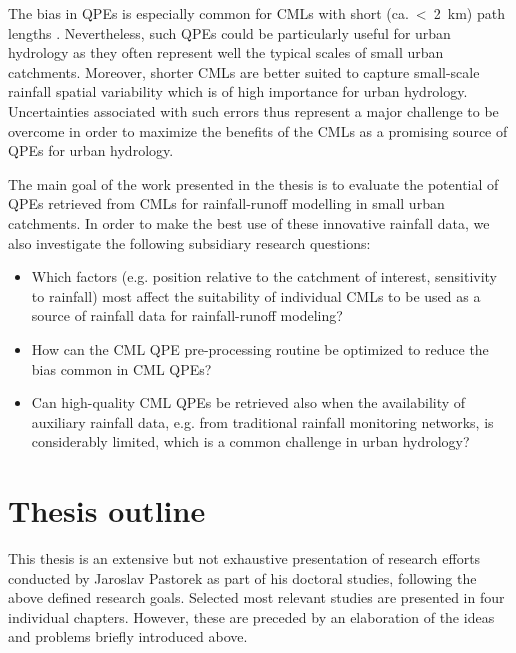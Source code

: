 \documentclass{ctuthesis}\usepackage[]{graphicx}\usepackage[]{color}
\begin{document}
The bias in QPEs is especially common for CMLs with short (ca.~<~2~km) path lengths  \citep{leijnseMicrowaveLinkRainfall2008}. Nevertheless, such QPEs could be particularly useful for urban hydrology as they often represent well the typical scales of small urban catchments. Moreover, shorter CMLs are better suited to capture small-scale rainfall spatial variability which is of high importance for urban hydrology. Uncertainties associated with such errors thus represent a major challenge to be overcome in order to maximize the benefits of the CMLs as a promising source of QPEs for urban hydrology.

The main goal of the work presented in the thesis is to evaluate the potential of QPEs retrieved from CMLs for rainfall-runoff modelling in small urban catchments. In order to make the best use of these innovative rainfall data, we also investigate the following subsidiary research questions:
\begin{itemize}
        \item Which factors (e.g. position relative to the catchment of interest, sensitivity to rainfall) most affect the suitability of individual CMLs to be used as a source of rainfall data for rainfall-runoff modeling? 
        \item How can the CML QPE pre-processing routine be optimized to reduce the bias common in CML QPEs?
        \item Can high-quality CML QPEs be retrieved also when the availability of auxiliary rainfall data, e.g. from traditional rainfall monitoring networks, is considerably limited, which is a common challenge in urban hydrology?
\end{itemize}



\section{Thesis outline}
This thesis is an extensive but not exhaustive presentation of research efforts conducted by Jaroslav Pastorek as part of his doctoral studies, following the above defined research goals. Selected most relevant studies are presented in four individual chapters. However, these are preceded by an elaboration of the ideas and problems briefly introduced above.  
\end{document}

